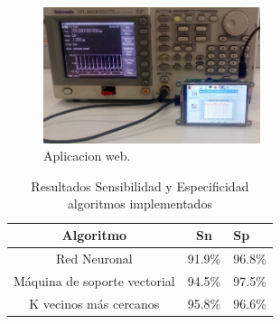 \documentclass[journal]{IEEEtran}
\begin{document}
\begin{figure}[!h]
	\centering
	\includegraphics[width=2.5in]{montaje}
	\caption{Aplicacion web.}
	\label{montaje_generador_rpi}
\end{figure}

%


	\begin{table}[h!]
	\centering
	
	\caption{Resultados Sensibilidad y Especificidad  algoritmos implementados
	}
	\def\arraystretch{1.2}%
	\begin{tabular}{c c l}
		
		\hline
		\textbf{Algoritmo} & \multicolumn{1}{c}{\textbf{Sn}} & \textbf{Sp}	\\ 
		\hline
		Red Neuronal  & 91.9\%	& 96.8\%\\
		Máquina de soporte vectorial  & 94.5\%	& 97.5\%\\		
		K vecinos más cercanos & 95.8\%	& 96.6\%\\
		
		\hline
	\end{tabular}%
	\label{cuadro:resultados_sn_sp}%
\end{table}%
\end{document}
